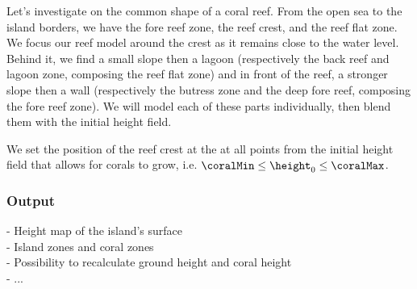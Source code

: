 Let's investigate on the common shape of a coral reef. From the open sea to the island borders, we have the fore reef zone, the reef crest, and the reef flat zone. We focus our reef model around the crest as it remains close to the water level. Behind it, we find a small slope then a lagoon (respectively the back reef and lagoon zone, composing the reef flat zone) and in front of the reef, a stronger slope then a wall (respectively the butress zone and the deep fore reef, composing the fore reef zone). We will model each of these parts individually, then blend them with the initial height field.

We set the position of the reef crest at the at all points from the initial height field that allows for corals to grow, i.e. $\coralMin \leq \height_0 \leq \coralMax$.



\subsubsection{Output}
- Height map of the island's surface \\
- Island zones and coral zones \\
- Possibility to recalculate ground height and coral height \\
- ...

